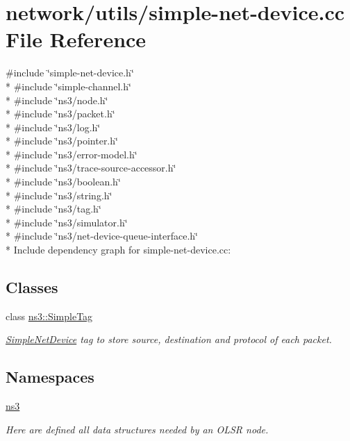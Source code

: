 \hypertarget{simple-net-device_8cc}{}\section{network/utils/simple-\/net-\/device.cc File Reference}
\label{simple-net-device_8cc}
{\ttfamily \#include \char`\"{}simple-\/net-\/device.\+h\char`\"{}}\\*
{\ttfamily \#include \char`\"{}simple-\/channel.\+h\char`\"{}}\\*
{\ttfamily \#include \char`\"{}ns3/node.\+h\char`\"{}}\\*
{\ttfamily \#include \char`\"{}ns3/packet.\+h\char`\"{}}\\*
{\ttfamily \#include \char`\"{}ns3/log.\+h\char`\"{}}\\*
{\ttfamily \#include \char`\"{}ns3/pointer.\+h\char`\"{}}\\*
{\ttfamily \#include \char`\"{}ns3/error-\/model.\+h\char`\"{}}\\*
{\ttfamily \#include \char`\"{}ns3/trace-\/source-\/accessor.\+h\char`\"{}}\\*
{\ttfamily \#include \char`\"{}ns3/boolean.\+h\char`\"{}}\\*
{\ttfamily \#include \char`\"{}ns3/string.\+h\char`\"{}}\\*
{\ttfamily \#include \char`\"{}ns3/tag.\+h\char`\"{}}\\*
{\ttfamily \#include \char`\"{}ns3/simulator.\+h\char`\"{}}\\*
{\ttfamily \#include \char`\"{}ns3/net-\/device-\/queue-\/interface.\+h\char`\"{}}\\*
Include dependency graph for simple-\/net-\/device.cc\+:
\subsection*{Classes}
\begin{DoxyCompactItemize}
\item 
class \hyperlink{classns3_1_1SimpleTag}{ns3\+::\+Simple\+Tag}
\begin{DoxyCompactList}\small\item\em \hyperlink{classns3_1_1SimpleNetDevice}{Simple\+Net\+Device} tag to store source, destination and protocol of each packet. \end{DoxyCompactList}\end{DoxyCompactItemize}
\subsection*{Namespaces}
\begin{DoxyCompactItemize}
\item 
 \hyperlink{namespacens3}{ns3}
\begin{DoxyCompactList}\small\item\em Here are defined all data structures needed by an O\+L\+SR node. \end{DoxyCompactList}\end{DoxyCompactItemize}
